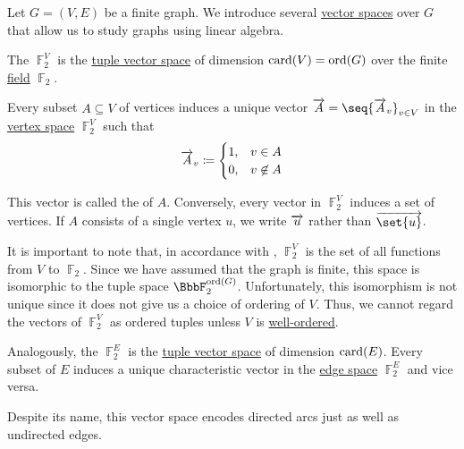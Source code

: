 \begin{definition}\label{def:graph_spaces}
  Let \( G = (V, E) \) be a finite graph. We introduce several \hyperref[def:vector_space]{vector spaces} over \( G \) that allow us to study graphs using linear algebra.

  \begin{thmenum}
     The  \( \BbbF_2^V \) is the \hyperref[def:left_module_of_tuples]{tuple vector space} of dimension \( \operatorname{card}(V) = \operatorname{ord}(G) \) over the finite \hyperref[def:field]{field} \hyperref[thm:f2_is_boolean_algebra]{\( \BbbF_2 \)}.

    Every subset \( A \subseteq V \) of vertices induces a unique vector \( \vect{A} = \seq{ \vect{A}_v }_{v \in V} \) in the \hyperref[def:graph_spaces/vertex]{vertex space} \( \BbbF_2^V \) such that
    \begin{equation*}
      \overrightarrow{A}_v \coloneqq \begin{cases}
        1, &v \in A \\
        0, &v \not\in A
      \end{cases}
    \end{equation*}

    This vector is called the  of \( A \). Conversely, every vector in \( \BbbF_2^V \) induces a set of vertices. If \( A \) consists of a single vertex \( u \), we write \( \overrightarrow{u} \) rather than \( \vect{\set{u}} \).

    It is important to note that, in accordance with , \( \BbbF_2^V \) is the set of all functions from \( V \) to \( \BbbF_2 \). Since we have assumed that the graph is finite, this space is isomorphic to the tuple space \( \BbbF_2^{\ord(G)} \). Unfortunately, this isomorphism is not unique since it does not give us a choice of ordering of \( V \). Thus, we cannot regard the vectors of \( \BbbF_2^V \) as ordered tuples unless \( V \) is \hyperref[def:well_ordered_set]{well-ordered}.

     Analogously, the  \( \BbbF_2^E \) is the \hyperref[def:left_module_of_tuples]{tuple vector space} of dimension \( \operatorname{card}(E) \). Every subset of \( E \) induces a unique characteristic vector in the \hyperref[def:graph_spaces/edge]{edge space} \( \BbbF_2^E \) and vice versa.

    Despite its name, this vector space encodes directed arcs just as well as undirected edges.


\end{thmenum}
\end{definition}
